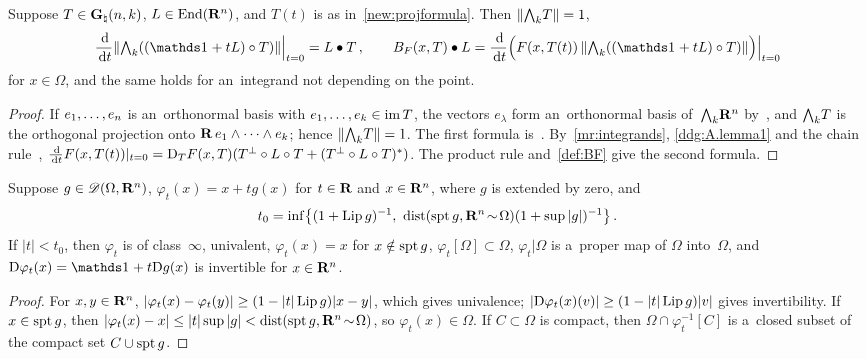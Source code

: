 \documentclass[a4paper,twoside,leqno]{article}
\newcommand{\Gk}{\pgrass{\adim}{\vdim}}        %
\newcommand{\MS}{\textbf{[MS path]}}            %
\begin{document}
\begin{lemma}[{\cite[(A.7), (A.8)]{DePhilippis2018}; new; \MS}]
    \label{new:BFderiv}
    Suppose $T \in \Gk$, $L \in \mathrm{End}({\mathbf{R}^{n}})$, and $T(t)$ is as in~\ref{new:projformula}. Then
    $\|{\textstyle\boldsymbol{\bigwedge}}_{{k}} T\| = 1$,
    \begin{displaymath}
        \frac{\ud}{\ud t} \|\extpower{\vdim}((\id{} + tL) \circ T)\| \Big|_{t=0} = L \bullet T \,,
        \qquad
        B_F(x,T) \bullet L = \frac{\ud}{\ud t} \Bigl( F(x,T(t)) \, \|\extpower{\vdim}((\id{} + tL)
        \circ T)\| \Bigr) \Big|_{t=0}
    \end{displaymath}
    for $x \in \Omega$, and the same holds for an~integrand not depending on the point.
\end{lemma}

\begin{proof}
    If $e_1, \ldots, e_{n}$ is an~orthonormal basis with $e_1, \ldots, e_{k} \in \operatorname{im} T$,
    the vectors $e_{\lambda}$ form an~orthonormal basis of~${\textstyle\boldsymbol{\bigwedge}}_{{k}} \mathbf{R}^{n}$
    by~\cite[1.7.5]{Federer1969}, and ${\textstyle\boldsymbol{\bigwedge}}_{{k}} T$ is the orthogonal projection onto $\mathbf{R}
    \, e_1 \wedge \cdots \wedge e_{k}$; hence $\|{\textstyle\boldsymbol{\bigwedge}}_{{k}} T\| = 1$. The first formula
    is~\cite[2.4(1)]{Allard1972}. By~\ref{mr:integrands}, \ref{ddg:A.lemma1} and the chain
    rule~\cite[3.1.11, 3.1.22]{Federer1969}, $\frac{\,\mathrm{d}}{\,\mathrm{d} t} F(x,T(t))|_{t=0} = \mathrm{D}_T F(x,T)
    (T^\perp \circ L \circ T + (T^\perp \circ L \circ T)^{*})$. The product rule
    and~\ref{def:BF} give the second formula.
\end{proof}

\begin{lemma}[new; \MS]
    \label{new:flow}
    Suppose $g \in \mathscr{D}(\Omega,\mathbf{R}^{n})$, $\varphi_t(x) = x + t g(x)$ for $t \in \mathbf{R}$ and $x
    \in \mathbf{R}^{n}$, where $g$ is extended by zero, and
    \begin{displaymath}
        t_0 = \inf \bigl\{ (1 + \operatorname{Lip} g)^{-1}, \ \operatorname{dist}(\operatorname{spt} g, \mathbf{R}^{n} \!\sim\! \Omega) (1 + \sup
        |g|)^{-1} \bigr\} \,.
    \end{displaymath}
    If $|t| < t_0$, then $\varphi_t$ is of class~$\infty$, univalent, $\varphi_t(x) = x$ for $x
    \notin \operatorname{spt} g$, $\varphi_t[\Omega] \subset \Omega$, $\varphi_t | \Omega$ is a~proper map of
    $\Omega$ into~$\Omega$, and $\uD \varphi_t(x) = \id{} + t \uD g(x)$ is invertible for $x \in
    \mathbf{R}^{n}$.
\end{lemma}

\begin{proof}
    For $x, y \in \mathbf{R}^{n}$, $|\varphi_t(x) - \varphi_t(y)| \ge (1 - |t| \operatorname{Lip} g) |x - y|$, which
    gives univalence; $|\mathrm{D} \varphi_t(x)(v)| \ge (1 - |t| \operatorname{Lip} g) |v|$ gives invertibility. If $x
    \in \operatorname{spt} g$, then $|\varphi_t(x) - x| \le |t| \sup |g| < \operatorname{dist}(\operatorname{spt} g, \mathbf{R}^{n} \!\sim\!
    \Omega)$, so $\varphi_t(x) \in \Omega$. If $C \subset \Omega$ is compact, then $\Omega \cap
    \varphi_t^{-1}[C]$ is a~closed subset of the compact set $C \cup \operatorname{spt} g$.
\end{proof}
\end{document}
